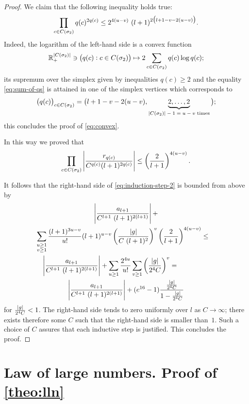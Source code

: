 \documentclass[12pt,usenames,dvipsnames,svgnames,table]{amsart}
\begin{document}
\begin{proof}
	We claim that the following inequality holds true:
	\begin{equation}
	\label{eq:convex}
	\prod_{c\in C(\sigma_2)} q(c)^{2q(c)} \leq 2^{4(u-v)}\  (l+1)^{2\big( l+1-v-2(u-v)\big)}.  
	\end{equation}
	Indeed, the logarithm of the left-hand side
	is a convex function
	\[ \mathbb{R}_+^{|C(\sigma_2)|} \ni \big( q(c) : c\in C(\sigma_2) \big) \mapsto 2 \sum_{c\in C(\sigma_2)} {q(c)}\log q(c);\]
	its supremum 
	over the simplex given by inequalities $q(c)\geq 2$ and the equality \eqref{eq:sum-of-qs}
	is attained in one of the simplex vertices which corresponds to
	\[ \big( q(c) \big)_{c\in C(\sigma_2)} = \big(l+1-v-2(u-v),\underbrace{2,\dots,2}_{\text{$|C(\sigma_2)|-1=u-v$ times}} \big);   \]
	this concludes the proof of \eqref{eq:convex}.
	
	In this way we proved that
	\[ \prod_{c\in C(\sigma_2)} \left| \frac{r_{q(c)}}{C^{q(c)} (l+1)^{2 q(c)}} \right| \leq 
	\left( \frac{2}{l+1} \right)^{4(u-v)}.
	\]
	
	It follows that the right-hand side of \eqref{eq:induction-step-2} is bounded from above by
	\begin{multline*} 
	\left| \frac{a_{l+1}}{C^{l+1}\ (l+1)^{2(l+1)}} \right| + \\
	\shoveright{\sum_{\substack{\parar\geq 1 \\ \parat\geq 1}} 
		\frac{(l+1)^{3\parar-\parat}}{\parar!} (l+1)^{\parar-\parat} \left(\frac{|\sconstant|}{C\ (l+1)^2}\right)^{\parat}
		\left( \frac{2}{l+1} \right)^{4(\parar-\parat)} \leq} \\
	\shoveleft{\left| \frac{a_{l+1}}{C^{l+1}\ (l+1)^{2(l+1)}} \right| + 
		\sum_{\parar\geq 1} 
		\frac{2^{4\parar}}{\parar!} \sum_{\parat\geq 1} \left(\frac{|\sconstant|}{2^4 C}\right)^{\parat} = }\\
	\left| \frac{a_{l+1}}{C^{l+1}\ (l+1)^{2(l+1)}} \right| + 
	(e^{16}-1) \frac{ \frac{|\sconstant|}{2^4 C} }{1 - \frac{|\sconstant|}{2^4 C}}
	\end{multline*}
	for $\frac{|g|}{2^4 C}<1$.
	The right-hand side tends to zero uniformly over $l$ as $C\to\infty$;
	there exists therefore some $C$ such that the right-hand side is smaller than~$1$.
	Such a choice of $C$ assures that each inductive step is justified.
	This concludes the proof.
\end{proof}

\section{Law of large numbers. Proof of \cref{theo:lln}}
\label{sec:proof-of-LLN}
\end{document}
